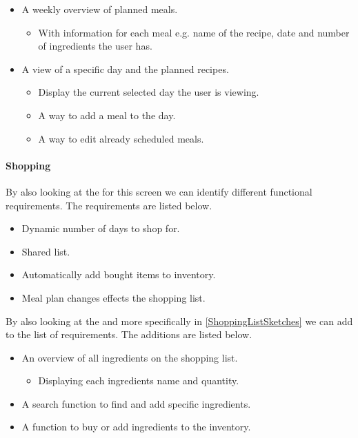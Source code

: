 \begin{itemize}
	\item A weekly overview of planned meals.
		\begin{itemize}
			\item With information  for each meal e.g. name of the recipe, date and number of ingredients the user has.
		\end{itemize}
	\item A view of a specific day and the planned recipes.
		\begin{itemize}
			\item Display the current selected day the user is viewing.
			\item A way to add a meal to the day.
			\item A way to edit already scheduled meals.
		\end{itemize}  
\end{itemize} 

\paragraph{Shopping}
By also looking at the  for this screen we can identify different functional requirements. The requirements are listed below.

\begin{itemize}
	\item Dynamic number of days to shop for.
	\item Shared list.
	\item Automatically add bought items to inventory.
	\item Meal plan changes effects the shopping list.
\end{itemize} 

By also looking at the  and more specifically in \cref{ShoppingListSketches} we can add to the list of requirements. The additions are listed below.

\begin{itemize}
	\item An overview of all ingredients on the shopping list.
		\begin{itemize}
			\item Displaying each ingredients name and quantity.
		\end{itemize}		 
	\item A search function to find and add specific ingredients.
	\item A function to buy or add ingredients to the inventory.	
\end{itemize}


